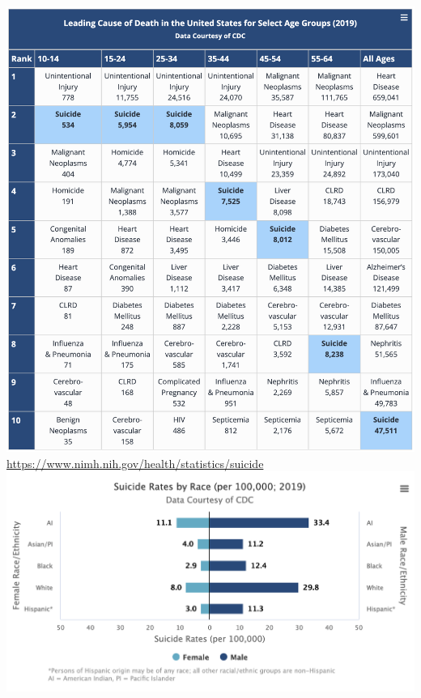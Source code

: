 \documentclass[nobackground,dvipsnames,table]{beamer}
\begin{document}
\begin{frame}{}
    \begin{columns}
            \includegraphics[width=\textwidth]{leading-causes-of-death-suicide-2019}
            \tiny
            \url{https://www.nimh.nih.gov/health/statistics/suicide}
            \includegraphics[width=\textwidth]{suicide-rates-by-race}
    \end{columns}
\end{frame}
\end{document}
